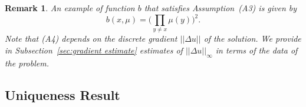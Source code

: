 \documentclass[11pt,a4paper]{amsart}
\newtheorem{remark}{Remark}
\theoremstyle{definition}
\begin{document}
\begin{remark}
    An example of function $b$ that satisfies Assumption~(A3) is given by
    \begin{equation*}
        b(x,\mu) = \bigg( \prod_{y \neq x} \mu(y) \bigg)^2.
    \end{equation*}
    Note that (A4) depends on the discrete gradient $||\Delta u||$ of the solution. We provide in Subsection~\ref{sec:gradient estimate} estimates of $||\Delta u||_\infty$ in terms of the data of the problem. 
\end{remark}

\subsection{Uniqueness Result}\label{sec:uniqueness}
\end{document}
